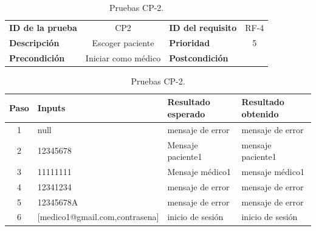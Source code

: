 \begin{table}[htbp]
    \centering
    \begin{tabular}{|lc|lc|}
    \toprule
        \textbf{ID de la prueba} & CP2 & \textbf{ID del requisito} & RF-4 \\
        \textbf{Descripción} &  Escoger paciente  & \textbf{Prioridad} & 5\\
        \textbf{Precondición} & Iniciar como médico   & \textbf{Postcondición} &   \\
        \bottomrule
    \end{tabular}

    \centering
    \begin{tabular}{clll}
    \toprule
    Paso & Inputs & Resultado esperado & Resultado obtenido  \\
    \midrule
    
    1 & null & mensaje de error & mensaje de error  \\
    2 & 12345678 & Mensaje paciente1 & mensaje paciente1  \\
    3 & 11111111 & Mensaje médico1 & mensaje médico1  \\
    4 & 12341234 & mensaje de error & mensaje de error \\
    5 & 12345678A & mensaje de error & mensaje de error  \\
    6  & [medico1@gmail.com,contrasena] & inicio de sesión & inicio de sesión  \\
    
    
    \bottomrule
    \end{tabular}
\caption{Pruebas CP-2.}
\label{Pruebas CP-2}
\end{table}

